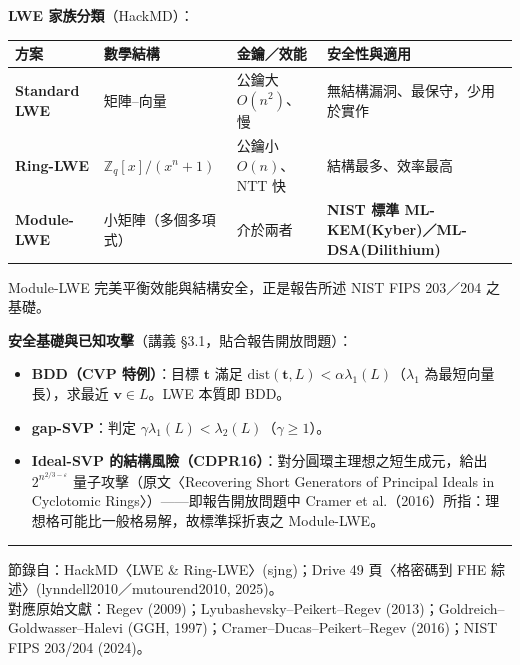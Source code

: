 \documentclass[10.5pt, a4paper]{article}
\theoremstyle{cpt}
\newcommand{\Z}{\mathbb{Z}}
\begin{document}
\textbf{LWE 家族分類}（HackMD）：
\begin{center}\footnotesize
\renewcommand{\arraystretch}{1.15}
\begin{tabular}{>{\bfseries}l l l l}
\hline
方案 & 數學結構 & 金鑰／效能 & 安全性與適用 \\
\hline
Standard LWE & 矩陣–向量 & 公鑰大 $O(n^2)$、慢 & 無結構漏洞、最保守，少用於實作 \\
Ring-LWE & $\Z_q[x]/(x^n+1)$ & 公鑰小 $O(n)$、NTT 快 & 結構最多、效率最高 \\
Module-LWE & 小矩陣（多個多項式） & 介於兩者 & \textbf{NIST 標準 ML-KEM(Kyber)／ML-DSA(Dilithium)} \\
\hline
\end{tabular}
\end{center}
Module-LWE 完美平衡效能與結構安全，正是報告所述 NIST FIPS 203／204 之基礎。

\textbf{安全基礎與已知攻擊}（講義 §3.1，貼合報告開放問題）：
\begin{itemize}
  \item \textbf{BDD（CVP 特例）}：目標 $\mathbf{t}$ 滿足 $\mathrm{dist}(\mathbf{t},L)<\alpha\lambda_1(L)$（$\lambda_1$ 為最短向量長），求最近 $\mathbf{v}\in L$。LWE 本質即 BDD。
  \item \textbf{gap-SVP}：判定 $\gamma\lambda_1(L)<\lambda_2(L)$（$\gamma\ge1$）。
  \item \textbf{Ideal-SVP 的結構風險（CDPR16）}：對分圓環主理想之短生成元，給出 $2^{n^{2/3-\varepsilon}}$ 量子攻擊（原文〈Recovering Short Generators of Principal Ideals in Cyclotomic Rings〉）——即報告開放問題中 Cramer et al.（2016）所指：理想格可能比一般格易解，故標準採折衷之 Module-LWE。
\end{itemize}

\vspace{4pt}
\noindent\rule{\linewidth}{0.4pt}
\begin{center}\footnotesize\color{gray}
  節錄自：HackMD〈LWE \& Ring-LWE〉(sjng)；Drive 49 頁〈格密碼到 FHE 綜述〉(lynndell2010／mutourend2010, 2025)。\\
  對應原始文獻：Regev (2009)；Lyubashevsky–Peikert–Regev (2013)；Goldreich–Goldwasser–Halevi (GGH, 1997)；Cramer–Ducas–Peikert–Regev (2016)；NIST FIPS 203/204 (2024)。
\end{center}
\end{document}
